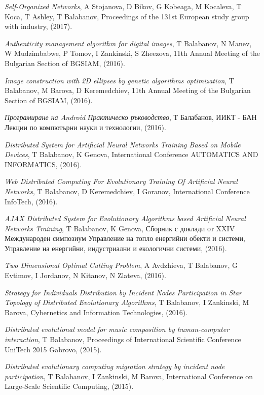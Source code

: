 \documentclass[bulgarian,a4paper]{europasscv}
\begin{document}
\begin{europasscv}
{\begin{ecvitemize}
    \item \textit{Self-Organized Networks}, A Stojanova, D Bikov, G Kobeaga, M Kocaleva, T Koca, T Ashley, T Balabanov, Proceedings of the 131st European study group with industry, (2017).
    \item \textit{Authenticity management algorithm for digital images}, T Balabanov, N Manev, W Mudzimbabwe, P Tomov, I Zankinski, S Zheezova, 11th Annual Meeting of the Bulgarian Section of BGSIAM, (2016).
    \item \textit{Image construction with 2D ellipses by genetic algorithms optimization}, T Balabanov, M Barova, D Keremedchiev, 11th Annual Meeting of the Bulgarian Section of BGSIAM, (2016).
    \item \textit{Програмиране на Android Практическо ръководство}, Т Балабанов, ИИКТ - БАН Лекции по компютърни науки и технологии, (2016).
    \item \textit{Distributed System for Artificial Neural Networks Training Based on Mobile Devices}, T Balabanov, K Genova, International Conference AUTOMATICS AND INFORMATICS, (2016).
    \item \textit{Web Distributed Computing For Evolutionary Training Of Artificial Neural Networks}, T Balabanov, D Keremedchiev, I Goranov, International Conference InfoTech, (2016).
    \item \textit{AJAX Distributed System for Evolutionary Algorithms based Artificial Neural Networks Training}, T Balabanov, K Genova, Сборник с доклади от XXIV Международен симпозиум Управление на топло енергийни обекти и системи, Управление на енергийни, индустриални и екологични системи, (2016).
    \item \textit{Two Dimensional Optimal Cutting Problem}, A Avdzhieva, T Balabanov, G Evtimov, I Jordanov, N Kitanov, N Zlateva, (2016).
    \item \textit{Strategy for Individuals Distribution by Incident Nodes Participation in Star Topology of Distributed Evolutionary Algorithms}, T Balabanov, I Zankinski, M Barova, Cybernetics and Information Technologies, (2016).
    \item \textit{Distributed evolutional model for music composition by human-computer interaction}, T Balabanov, Proceedings of International Scientific Conference UniTech 2015 Gabrovo, (2015).
    \item \textit{Distributed evolutionary computing migration strategy by incident node participation}, T Balabanov, I Zankinski, M Barova, International Conference on Large-Scale Scientific Computing, (2015).

\end{ecvitemize}}
\end{europasscv}
\end{document}
